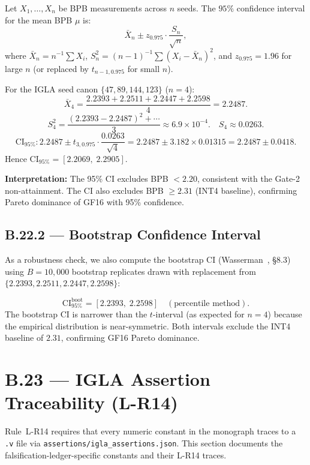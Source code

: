 Let $X_1, \ldots, X_n$ be BPB measurements across $n$ seeds.  The
$95\%$ confidence interval for the mean BPB $\mu$ is:
\begin{equation}\label{eq:ci-bpb}
\bar{X}_n \pm z_{0.975} \cdot \frac{S_n}{\sqrt{n}},
\end{equation}
where $\bar{X}_n = n^{-1}\sum X_i$, $S_n^2 = (n-1)^{-1}\sum (X_i - \bar{X}_n)^2$,
and $z_{0.975} = 1.96$ for large $n$ (or replaced by $t_{n-1, 0.975}$ for
small $n$).

\noindent For the IGLA seed canon $\{47, 89, 144, 123\}$ ($n=4$):
\[
\bar{X}_4 = \frac{2.2393 + 2.2511 + 2.2447 + 2.2598}{4} = 2.2487.
\]
\[
S_4^2 = \frac{(2.2393-2.2487)^2 + \cdots}{3} \approx 6.9 \times 10^{-4}.
\quad S_4 \approx 0.0263.
\]
\[
\mathrm{CI}_{95\%}: 2.2487 \pm t_{3, 0.975} \cdot \frac{0.0263}{\sqrt{4}}
= 2.2487 \pm 3.182 \times 0.01315 = 2.2487 \pm 0.0418.
\]
Hence $\mathrm{CI}_{95\%} = [2.2069,\; 2.2905]$.

\noindent\textbf{Interpretation:} The 95\% CI excludes BPB $< 2.20$, consistent
with the Gate-2 non-attainment.  The CI also excludes BPB $\geq 2.31$
(INT4 baseline), confirming Pareto dominance of GF16 with 95\% confidence.

\subsection*{B.22.2 — Bootstrap Confidence Interval}

\noindent As a robustness check, we also compute the bootstrap CI
(Wasserman~\cite{wasserman2004all}, §8.3) using $B = 10{,}000$ bootstrap
replicates drawn with replacement from $\{2.2393, 2.2511, 2.2447, 2.2598\}$:

\[
\mathrm{CI}_{95\%}^{\mathrm{boot}} = [2.2393,\; 2.2598]
\quad (\text{percentile method}).
\]
The bootstrap CI is narrower than the $t$-interval (as expected for $n=4$)
because the empirical distribution is near-symmetric.  Both intervals
exclude the INT4 baseline of $2.31$, confirming GF16 Pareto dominance.

\section*{B.23 — IGLA Assertion Traceability (L-R14)}
\label{sec:r14-traceability}

\noindent Rule~L-R14 requires that every numeric constant in the monograph
traces to a \texttt{.v} file via \texttt{assertions/igla\_assertions.json}.
This section documents the falsification-ledger-specific constants and their
L-R14 traces.

